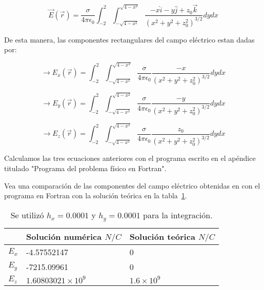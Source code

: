 \begin{equation}
    \vec{E} (\vec{r}) = \frac{\sigma}{4\pi \epsilon_0} 
    \displaystyle\int_{-2}^{2} 
    \displaystyle\int_{- \sqrt{4 - x^2} }^{\sqrt{4 - x^2}}
    \frac{ -x \hat{i} - y \hat{j} + z_{0} \vec{k} }{\left( x^2 + y^2 + z_{0}^{2} \right)^{3/2}} dy dx
\end{equation}

De esta manera, las componentes rectangulares del campo eléctrico estan dadas por:

\begin{equation}
    \longrightarrow
    E_{x} (\vec{r}) =  
    \displaystyle\int_{-2}^{2} 
    \displaystyle\int_{- \sqrt{4 - x^2} }^{\sqrt{4 - x^2}}
    \frac{\sigma}{4\pi \epsilon_0}
    \frac{ -x }{\left( x^2 + y^2 + z_{0}^{2} \right)^{3/2}} dy dx
\end{equation}

\begin{equation}
    \longrightarrow
    E_{y} (\vec{r}) =  
    \displaystyle\int_{-2}^{2} 
    \displaystyle\int_{- \sqrt{4 - x^2} }^{\sqrt{4 - x^2}}
    \frac{\sigma}{4\pi \epsilon_0}
    \frac{ -y }{\left( x^2 + y^2 + z_{0}^{2} \right)^{3/2}} dy dx
\end{equation}

\begin{equation}
    \longrightarrow
    E_{z} (\vec{r}) =  
    \displaystyle\int_{-2}^{2} 
    \displaystyle\int_{- \sqrt{4 - x^2} }^{\sqrt{4 - x^2}}
    \frac{\sigma}{4\pi \epsilon_0}
    \frac{ z_0 }{\left( x^2 + y^2 + z_{0}^{2} \right)^{3/2}} dy dx
\end{equation}

Calculamos las tres ecuaciones anteriores con el programa escrito en el apéndice titulado "Programa del problema físico en Fortran".


Vea una comparación de las componentes del campo eléctrico obtenidas en con el programa en Fortran con la solución teórica en la tabla~\ref{table_results}.

\begin{table}[hbt!]
    \begin{threeparttable}
    \begin{tabular}{lll}
    \toprule
    \headrow & Solución numérica $N/C$ & Solución teórica $N/C$ \\
    \midrule
    $E_x$ & -4.57552147 & 0 \\ 
    \midrule
    $E_y$ & -7215.09961 & 0 \\ 
    \midrule
    $E_z$ & $1.60803021 \times 10^9$ & $1.6 \times 10^9$ \\ 
    \bottomrule
    \end{tabular}
    \caption{Se utilizó $h_x = 0.0001$ y $h_y = 0.0001$ para la integración.}
    \label{table_results}
\end{threeparttable}
\end{table}